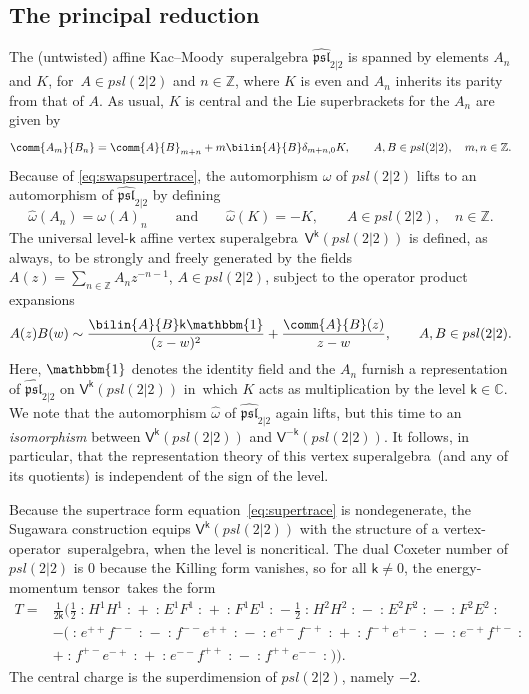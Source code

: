 \documentclass[10pt,a4paper]{amsart}
\numberwithin{equation}{section}
\newcommand{\wun}{\mathbbm{1}} %
\newcommand{\kk}{\mathsf{k}} %
\newcommand{\no}[1]{\mathopen{:} #1 \mathclose{:}} %
\newcommand{\fld}[1]{\mathbb{#1}} %
\newcommand{\alg}[1]{\mathfrak{#1}} %
\newcommand{\VOA}[1]{\mathsf{#1}} %
\newcommand{\ZZ}{\fld{Z}}
\newcommand{\CC}{\fld{C}}
\newcommand{\affine}[1]{\widehat{#1}}
\newcommand{\SLSA}[3]{\alg{#1}_{#2 \vert #3}} %
\newcommand{\AKMSA}[3]{\affine{\alg{#1}}_{#2 \vert #3}} %
\newcommand{\psl}{\SLSA{psl}{2}{2}}
\newcommand{\apsl}{\AKMSA{psl}{2}{2}}
\newcommand{\uaff}[2]{\VOA{V}^{#1}(#2)} %
\newcommand{\upsl}[1][\kk]{\uaff{#1}{\psl}} %
\newcommand{\km}{Kac--Moody}
\newcommand{\vo}{vertex-operator}
\newcommand{\svoa}{\vo\ superalgebra}
\newcommand{\sva}{vertex superalgebra}
\newcommand{\emt}{energy-momentum tensor}
\newcommand{\ope}{operator product expansion}
\newcommand{\opes}{\ope s}
\def\smash#1{#1}
\def\psl{psl(2|2)}
\begin{document}
\subsection{The principal reduction} \label{sec:Walg}

The (untwisted) affine \km\ superalgebra \smash{$\apsl$} is spanned by elements $A_n$ and $K$, for~${A \in \psl}$ and $n \in \ZZ$, where $K$ is even and $A_n$ inherits its parity from that of $A$.
As usual, $K$ is central and the Lie superbrackets for the $A_n$ are given by
\[
	\comm{A_m}{B_n} = \comm{A}{B}_{m+n} + m \bilin{A}{B} \delta_{m+n,0} K, \qquad A,B \in \psl,\quad m,n \in \ZZ.
\]
Because of \eqref{eq:swapsupertrace}, the automorphism $\omega$ of \smash{$\psl$} lifts to an automorphism of \smash{$\apsl$} by defining
\[
	\affine{\omega}(A_n) = \omega(A)_n \qquad \text{and} \qquad \affine{\omega}(K) = -K, \qquad A \in \psl,\quad n \in \ZZ.
\]
The universal level-$\kk$ affine \sva\ \smash{$\upsl$} is defined, as always, to be strongly and freely generated by the fields \smash{$A(z) = \sum_{n\in\ZZ} A_n z^{-n-1}$}, $A \in \psl$, subject to the \opes
\[
	A(z) B(w) \sim \frac{\bilin{A}{B} \kk \wun}{(z-w)^2} + \frac{\comm{A}{B}(z)}{z-w}, \qquad A,B \in \psl.
\]
Here, $\wun$ denotes the identity field and the $A_n$ furnish a representation of \smash{$\apsl$} on \smash{$\upsl$} in~which $K$ acts as multiplication by the level $\kk \in \CC$.
We note that the automorphism $\affine{\omega}$ of \smash{$\apsl$} again lifts, but this time to an \emph{isomorphism} between \smash{$\upsl$} and $\upsl[-\kk]$.
It follows, in particular, that the representation theory of this \sva\ (and any of its quotients) is independent of the sign of the level.

Because the supertrace form equation~\eqref{eq:supertrace} is nondegenerate, the Sugawara construction equips \smash{$\upsl$} with the structure of a \svoa, when the level is noncritical.
The dual Coxeter number of \smash{$\psl$} is $0$ because the Killing form vanishes, so for all $\kk\ne0$, the \emt\ takes the form
\begin{align*}%
	T = {}&\tfrac{1}{2\kk} \bigl( \tfrac{1}{2} \no{H^1H^1} + \no{E^1F^1} + \no{F^1E^1} - \tfrac{1}{2} \no{H^2H^2} - \no{E^2F^2} - \no{F^2E^2} \\
	& - \big(\no{e^{++}f^{--}} - \no{f^{--}e^{++}} - \no{e^{+-}f^{-+}} + \no{f^{-+}e^{+-}} - \no{e^{-+}f^{+-}} \\
	& + \no{f^{+-}e^{-+}} + \no{e^{--}f^{++}} - \no{f^{++}e^{--}}\big) \bigr).
\end{align*}
The central charge is the superdimension of \smash{$\psl$}, namely $-2$.
\end{document}
